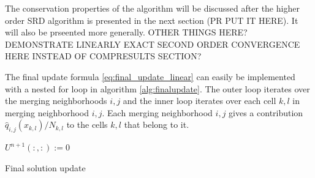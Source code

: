 The conservation properties of the algorithm will be discussed after the
higher order SRD algorithm is presented in the next
section (PR PUT IT HERE). It will also be prseented more generally.   
OTHER THINGS HERE? DEMONSTRATE LINEARLY EXACT SECOND ORDER CONVERGENCE
HERE INSTEAD OF COMPRESULTS SECTION?

The final update formula \eqref{eq:final_update_linear} can easily be implemented with a nested for loop in algorithm \ref{alg:finalupdate}.  
The outer loop iterates over the merging neighborhoods $i,j$ and the inner loop iterates over each cell $k,l$ in merging neighborhood $i,j$.  Each merging neighborhood $i,j$ gives a contribution $ \hat{q}_{i,j}(x_{k,l})/N_{k,l} $ to the cells $k,l$ that belong to it.
\begin{algorithm}[H]
\SetAlgoLined
$U^{n+1}(:,:) := 0$\\
 \caption{Final solution update} \label{alg:finalupdate}
\end{algorithm}


